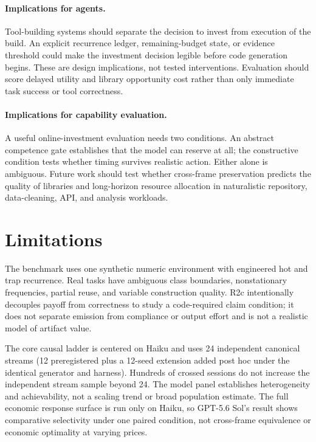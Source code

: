 \documentclass{article}
\begin{document}
\paragraph{Implications for agents.}
Tool-building systems should separate the decision to invest from execution of
the build. An explicit recurrence ledger, remaining-budget state, or evidence
threshold could make the investment decision legible before code generation
begins. These are design implications, not tested interventions. Evaluation
should score delayed utility and library opportunity cost rather than only
immediate task success or tool correctness.

\paragraph{Implications for capability evaluation.}
A useful online-investment evaluation needs two conditions. An abstract
competence gate establishes that the model can reserve at all; the constructive
condition tests whether timing survives realistic action. Either alone is
ambiguous. Future work should test whether cross-frame preservation predicts
the quality of libraries and long-horizon resource allocation in naturalistic
repository, data-cleaning, API, and analysis workloads.

\section{Limitations}

The benchmark uses one synthetic numeric environment with engineered hot and
trap recurrence. Real tasks have ambiguous class boundaries, nonstationary
frequencies, partial reuse, and variable construction quality. R2c intentionally
decouples payoff from correctness to study a code-required claim condition; it
does not separate emission from compliance or output effort and is not a
realistic model of artifact value.

The core causal ladder is centered on Haiku and uses 24 independent canonical
streams (12 preregistered plus a 12-seed extension added post hoc under the
identical generator and harness). Hundreds of crossed sessions do not increase
the independent stream sample beyond 24. The model panel establishes heterogeneity and achievability,
not a scaling trend or broad population estimate. The full economic response
surface is run only on Haiku, so GPT-5.6 Sol's result shows comparative
selectivity under one paired condition, not cross-frame equivalence or economic
optimality at varying prices.
\end{document}
